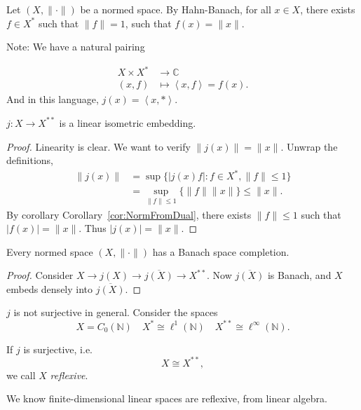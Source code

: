 
Let $(X, \|\cdot \|)$ be a normed space. By Hahn-Banach, for all $x \in X$, there exists $f \in X^*$ such that $\|f\| = 1$, such that $f(x) = \|x\|$. 

Note: We have a natural pairing

\begin{align*}
	 X \times X^* &\longrightarrow \mathbb{C} \\
	 (x, f) &\longmapsto \left\langle x, f \right\rangle  = f(x)
.\end{align*}
And in this language, $j(x) = \left\langle x, * \right\rangle $.

\begin{proposition}
	\label{prop:DoubleDualEmbedding}
	
	$j: X \to X^{* *}$ is a linear isometric embedding.
\end{proposition}
\begin{proof}
	Linearity is clear. We want to verify $\|j(x)\| = \|x\|$. Unwrap the definitions,
	\begin{align*}
		\|j(x)\| &= \sup \{|j(x) f|: f \in X^*, \|f\| \le  1\} \\
		&= \sup_{\|f\| \le  1} \{\|f\| \|x\|\} \le \|x\|
	.\end{align*} 
	By corollary Corollary~\ref{cor:NormFromDual}, there exists $\|f\| \le 1$ such that $|f(x)| = \|x\|$. Thus $|j(x)| = \|x\|$.
\end{proof}

\begin{corollary}
	\label{cor:NormedSpaceBanachCompletion}
	
	Every normed space $(X, \|\cdot \|)$ has a Banach space completion.
\end{corollary}
\begin{proof}
	Consider $X \to j(X) \rightarrow \overline{j(X)}  \rightarrow X^{**}$. Now $\overline{j(X)}$ is Banach, and $X$ embeds densely into $\overline{j(X)} $.
\end{proof}

\begin{example}
	$j$ is not surjective in general. Consider the spaces
	\[
		X = C_0(\mathbb{N}) \quad X^* \cong \ell^1(\mathbb{N}) \quad X^{* *} \cong \ell^{\infty }(\mathbb{N})
	.\] 
\end{example}

\begin{definition}
	\label{defn:ReflexiveSpace}
	If $j$ is surjective, i.e.
	\[
		X \cong X^{* *}
	,\] 
	we call $X$ \textit{reflexive}.
\end{definition}
We know finite-dimensional linear spaces are reflexive, from linear algebra.


